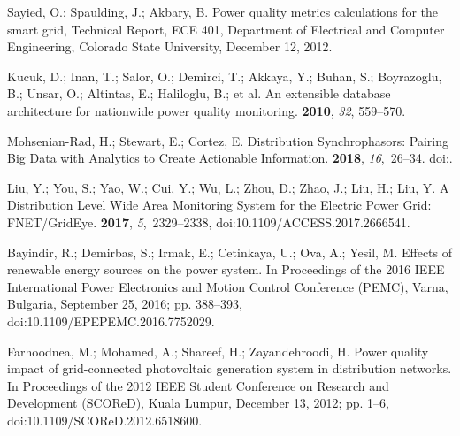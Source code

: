 \documentclass[energies,article,accept,moreauthors,pdftex]{Definitions/mdpi}
\begin{document}
\begin{thebibliography}{999}
Sayied, O.; Spaulding, J.; Akbary, B.
\newblock Power quality metrics calculations for the smart grid, Technical Report, ECE 401, Department of Electrical and Computer Engineering, Colorado State University, December 12, 2012.

Kucuk, D.; Inan, T.; Salor, O.; Demirci, T.; Akkaya, Y.; Buhan, S.; Boyrazoglu,
B.; Unsar, O.; Altintas, E.; Haliloglu, B.; et al.
\newblock An extensible database architecture for nationwide power quality
monitoring.
 {\bf 2010}, {\em 32},  559--570.

Mohsenian-Rad, H.; Stewart, E.; Cortez, E.
\newblock Distribution {Synchrophasors}: {Pairing} {Big} {Data} with
{Analytics} to {Create} {Actionable} {Information}.
 {\bf 2018}, {\em 16},~26--34.
\newblock
doi:{\href{https://doi.org/10.1109/MPE.2018.2790818}{}}.

Liu, Y.; You, S.; Yao, W.; Cui, Y.; Wu, L.; Zhou, D.; Zhao, J.; Liu, H.; Liu,
Y.
\newblock A {Distribution} {Level} {Wide} {Area} {Monitoring} {System} for the
{Electric} {Power} {Grid}: {FNET}/{GridEye}.
 {\bf 2017}, {\em 5},~2329--2338, doi:10.1109/ACCESS.2017.2666541.

Bayindir, R.; Demirbas, S.; Irmak, E.; Cetinkaya, U.; Ova, A.; Yesil, M.
\newblock Effects of renewable energy sources on the power system.
\newblock In {Proceedings of the } 2016 {IEEE} {International} {Power} {Electronics} and {Motion}
{Control} {Conference} ({PEMC}), Varna, Bulgaria, September 25, 2016; pp. 388--393, doi:10.1109/EPEPEMC.2016.7752029.

Farhoodnea, M.; Mohamed, A.; Shareef, H.; Zayandehroodi, H.
\newblock Power quality impact of grid-connected photovoltaic generation system
in distribution networks.
\newblock In {Proceedings of the } 2012 {IEEE} {Student} {Conference} on {Research} and {Development}
({SCOReD}), Kuala Lumpur, December 13, 2012; pp. 1--6, doi:10.1109/SCOReD.2012.6518600.


\end{thebibliography}
\end{document}
